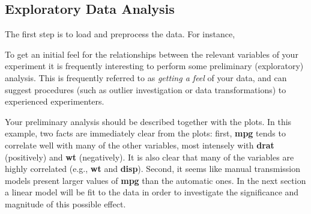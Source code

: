 \documentclass[
]{article}
\newenvironment{Shaded}{\begin{snugshade}}{\end{snugshade}}
\newcommand{\CommentTok}[1]{\textcolor[rgb]{0.56,0.35,0.01}{\textit{#1}}}
\newcommand{\FunctionTok}[1]{\textcolor[rgb]{0.00,0.00,0.00}{#1}}
\newcommand{\NormalTok}[1]{#1}
\newcommand{\OtherTok}[1]{\textcolor[rgb]{0.56,0.35,0.01}{#1}}
\newcommand{\SpecialCharTok}[1]{\textcolor[rgb]{0.00,0.00,0.00}{#1}}
\newcommand{\StringTok}[1]{\textcolor[rgb]{0.31,0.60,0.02}{#1}}
\begin{document}
\begin{Shaded}
\end{Shaded}

\hypertarget{exploratory-data-analysis}{%
\subsection{Exploratory Data Analysis}\label{exploratory-data-analysis}}

The first step is to load and preprocess the data. For instance,

To get an initial feel for the relationships between the relevant
variables of your experiment it is frequently interesting to perform
some preliminary (exploratory) analysis. This is frequently referred to
as \emph{getting a feel} of your data, and can suggest procedures (such
as outlier investigation or data transformations) to experienced
experimenters.

Your preliminary analysis should be described together with the plots.
In this example, two facts are immediately clear from the plots: first,
\textbf{mpg} tends to correlate well with many of the other variables,
most intensely with \textbf{drat} (positively) and \textbf{wt}
(negatively). It is also clear that many of the variables are highly
correlated (e.g., \textbf{wt} and \textbf{disp}). Second, it seems like
manual transmission models present larger values of \textbf{mpg} than
the automatic ones. In the next section a linear model will be fit to
the data in order to investigate the significance and magnitude of this
possible effect.
\end{document}
